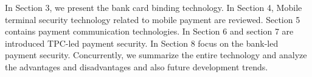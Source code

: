 \documentclass[journal]{IEEEtran}
\begin{document}
In Section 3, we present the bank card binding technology. In Section 4, Mobile terminal security technology related to mobile payment are reviewed. Section 5 contains payment communication technologies. In Section 6 and section 7 are introduced TPC-led payment security. In Section 8 focus on the bank-led payment security. Concurrently, we summarize the entire technology and analyze the advantages and disadvantages and also future development trends.



\end{document}
